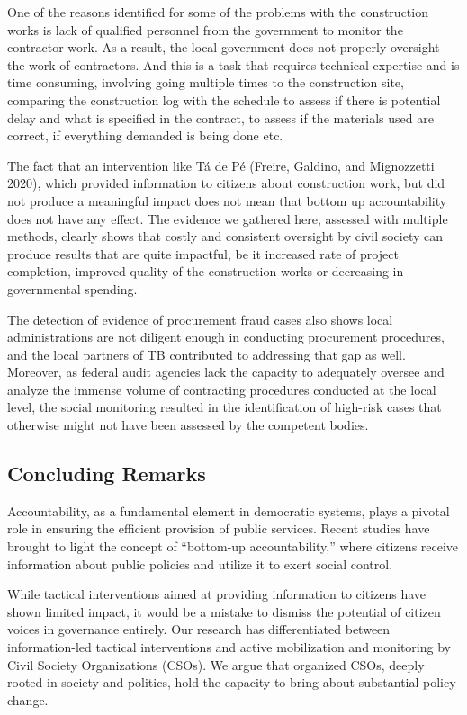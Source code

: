 \documentclass[]{AEA}
\begin{document}
One of the reasons identified for some of the problems with the
construction works is lack of qualified personnel from the government to
monitor the contractor work. As a result, the local government does not
properly oversight the work of contractors. And this is a task that
requires technical expertise and is time consuming, involving going
multiple times to the construction site, comparing the construction log
with the schedule to assess if there is potential delay and what is
specified in the contract, to assess if the materials used are correct,
if everything demanded is being done etc.

The fact that an intervention like Tá de Pé (Freire, Galdino, and
Mignozzetti 2020), which provided information to citizens about
construction work, but did not produce a meaningful impact does not mean
that bottom up accountability does not have any effect. The evidence we
gathered here, assessed with multiple methods, clearly shows that costly
and consistent oversight by civil society can produce results that are
quite impactful, be it increased rate of project completion, improved
quality of the construction works or decreasing in governmental
spending.

The detection of evidence of procurement fraud cases also shows local
administrations are not diligent enough in conducting procurement
procedures, and the local partners of TB contributed to addressing that
gap as well. Moreover, as federal audit agencies lack the capacity to
adequately oversee and analyze the immense volume of contracting
procedures conducted at the local level, the social monitoring resulted
in the identification of high-risk cases that otherwise might not have
been assessed by the competent bodies.

\hypertarget{concluding-remarks}{%
\subsection{Concluding Remarks}\label{concluding-remarks}}

Accountability, as a fundamental element in democratic systems, plays a
pivotal role in ensuring the efficient provision of public services.
Recent studies have brought to light the concept of ``bottom-up
accountability,'' where citizens receive information about public
policies and utilize it to exert social control.

While tactical interventions aimed at providing information to citizens
have shown limited impact, it would be a mistake to dismiss the
potential of citizen voices in governance entirely. Our research has
differentiated between information-led tactical interventions and active
mobilization and monitoring by Civil Society Organizations (CSOs). We
argue that organized CSOs, deeply rooted in society and politics, hold
the capacity to bring about substantial policy change.
\end{document}
